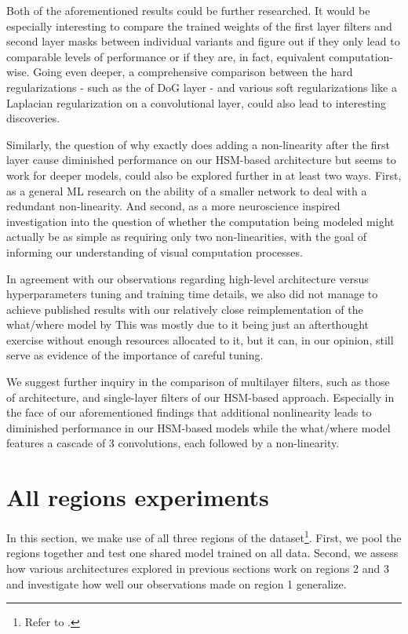 Both of the aforementioned results could be further researched. It would be especially interesting to compare the trained weights of the first layer filters and second layer masks between individual variants and figure out if they only lead to comparable levels of performance or if they are, in fact, equivalent computation-wise. Going even deeper, a comprehensive comparison between the hard regularizations - such as the of DoG layer - and various soft regularizations like a Laplacian regularization on a convolutional layer, could also lead to interesting discoveries. 

Similarly, the question of why exactly does adding a non-linearity after the first layer cause diminished performance on our HSM-based architecture but seems to work for deeper models, could also be explored further in at least two ways. First, as a general ML research on the ability of a smaller network to deal with a redundant non-linearity. And second, as a more neuroscience inspired investigation into the question of whether the computation being modeled might actually be as simple as requiring only two non-linearities, with the goal of informing our understanding of visual computation processes.


In agreement with our observations regarding high-level architecture versus hyperparameters tuning and training time details, we also did not manage to achieve published results with our relatively close reimplementation of the what/where model by \citeauthor{klindt} This was mostly due to it being just an afterthought exercise without enough resources allocated to it, but it can, in our opinion, still serve as evidence of the importance of careful tuning. 

We suggest further inquiry in the comparison of multilayer filters, such as those of \citeauthor{klindt} architecture, and single-layer filters of our HSM-based approach. Especially in the face of our aforementioned findings that additional nonlinearity leads to diminished performance in our HSM-based models while the what/where model features a cascade of 3 convolutions, each followed by a non-linearity. 

\section{All regions experiments}

In this section, we make use of all three regions of the dataset\footnote{Refer to .}. First, we pool the regions together and test one shared model trained on all data. Second, we assess how various architectures explored in previous sections work on regions 2 and 3 and investigate how well our observations made on region 1 generalize.

